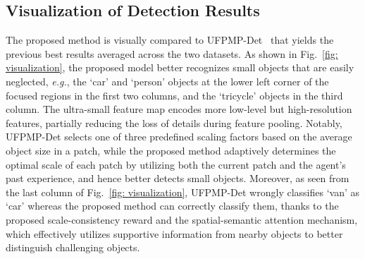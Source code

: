\documentclass[letterpaper]{article} %
\def \eg {\emph{e.g.}}
\begin{document}
\subsection{Visualization of Detection Results}
\label{ssec:visualization}
The proposed method is visually compared %
to UFPMP-Det~\cite{Huang_2022_UFPMP} that yields the previous best results averaged across the two datasets. As shown in Fig.~\ref{fig: visualization}, the proposed model better recognizes small objects that are easily neglected, \eg, the `car' and `person' objects at the lower left corner of the focused regions in the first two columns, and the `tricycle' objects in the third column. The ultra-small feature map encodes more low-level but high-resolution features, partially reducing the %
loss of details during feature pooling. %
Notably, UFPMP-Det selects one of three predefined scaling factors based on the average object size in a patch, while the proposed method adaptively determines the optimal scale of each patch by utilizing both the current patch and %
the agent's past experience, and hence better detects small objects. Moreover, as seen from the last column of Fig.~\ref{fig: visualization}, UFPMP-Det wrongly classifies
`van' as `car' whereas the proposed method can correctly classify them, thanks to the proposed scale-consistency reward and the spatial-semantic attention mechanism, which %
effectively utilizes supportive information from nearby objects to better distinguish challenging objects.
\end{document}
